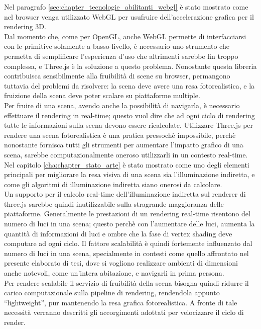 Nel paragrafo \ref{sec:chapter_tecnologie_abilitanti_webgl} è stato mostrato come nel browser venga utilizzato WebGL per usufruire dell’accelerazione grafica per il rendering 3D.
\\ 
Dal momento che, come per OpenGL, anche WebGL permette di interfacciarsi con le primitive solamente a basso livello, è necessario uno strumento che permetta di semplificare l’esperienza d’uso che altrimenti sarebbe fin troppo complessa, e Three.js è la soluzione a questo problema. Nonostante questa libreria contribuisca sensibilmente alla fruibilità di scene su browser, permangono tuttavia del problemi da risolvere: la scena deve avere una resa fotorealistica, e la fruizione della scena deve poter scalare su piattaforme multiple.
\\
Per fruire di una scena, avendo anche la possibilità di navigarla, è necessario effettuare il rendering in real-time; questo vuol dire che ad ogni ciclo di rendering tutte le informazioni sulla scena devono essere ricalcolate.
Utilizzare Three.js per rendere una scena fotorealistica è una pratica pressochè impossibile, perchè nonostante fornisca tutti gli strumenti per aumentare l’impatto grafico di una scena, sarebbe computazionalmente oneroso utilizzarli in un contesto real-time.
Nel capitolo \ref{cha:chapter_stato_arte} è stato mostrato come uno degli elementi principali per migliorare la resa visiva di una scena sia l’illuminazione indiretta, e come gli algoritmi di illuminazione indiretta siano onerosi da calcolare.
\\
Un supporto per il calcolo real-time dell’illuminazione indiretta sul renderer di three.js sarebbe quindi inutilizzabile sulla stragrande maggioranza delle piattaforme. Generalmente le prestazioni di un rendering real-time risentono del numero di luci in una scena; questo perchè con l’aumentare delle luci, aumenta la quantità di informazioni di luci e ombre che la fase di vertex shading deve computare ad ogni ciclo.
Il fattore scalabilità è quindi fortemente influenzato dal numero di luci in una scena, specialmente in contesti come quello affrontato nel presente elaborato di tesi, dove si vogliono realizzare ambienti di dimensioni anche notevoli, come un’intera abitazione, e navigarli in prima persona.
\\
Per rendere scalabile il servizio di fruibilità della scena bisogna quindi ridurre il carico computazionale sulla pipeline di rendering, rendendola appunto “lightweight”, pur mantenendo la resa grafica fotorealistica.
A fronte di tale necessità verranno descritti gli accorgimenti adottati per velocizzare il ciclo di render.
